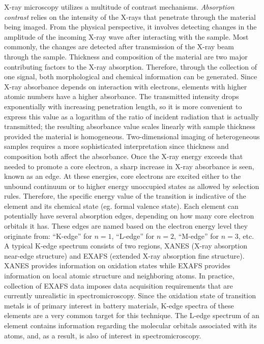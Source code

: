 \documentclass[journal=cmatex,manuscript=perspective]{achemso}
\begin{document}
X-ray microscopy utilizes a multitude of contrast
mechanisms. \emph{Absorption contrast} relies on the intensity of the X-rays
that penetrate through the material being imaged. From the physical
perspective, it involves detecting changes in the amplitude of the
incoming X-ray wave after interacting with the sample. Most commonly,
the changes are detected after transmission of the X-ray beam through
the sample. Thickness and composition of the material are two major
contributing factors to the X-ray absorption. Therefore, through the
collection of one signal, both morphological and chemical information
can be generated. Since X-ray absorbance depends on interaction with
electrons, elements with higher atomic numbers have a higher
absorbance. The transmitted intensity drops exponentially with
increasing penetration length, so it is more convenient to express
this value as a logarithm of the ratio of incident radiation that is
actually transmitted; the resulting absorbance value scales linearly
with sample thickness provided the material is
homogeneous. Two-dimensional imaging of heterogeneous samples requires
a more sophisticated interpretation since thickness and composition
both affect the absorbance. Once the X-ray energy exceeds that needed
to promote a core electron, a sharp increase in X-ray absorbance is
seen, known as an edge. At these energies, core electrons are excited
either to the unbound continuum or to higher energy unoccupied states
as allowed by selection rules. Therefore, the specific energy value of
the transition is indicative of the element and its chemical state
(eg. formal valence state). Each element can potentially have
several absorption edges, depending on how many core electron orbitals
it has. These edges are named based on the electron energy level they
originate from: ``K-edge'' for $n=1$, ``L-edge'' for $n=2$, ``M-edge''
for $n=3$, etc. A typical K-edge spectrum consists of two regions,
XANES (X-ray absorption near-edge structure) and EXAFS (extended X-ray
absorption fine structure). XANES provides information on oxidation
states while EXAFS provides information on local atomic structure and
neighboring atoms. In practice, collection of EXAFS data imposes data
acquisition requirements that are currently unrealistic in
spectromicroscopy. Since the oxidation state of transition metals is
of primary interest in battery materials, K-edge spectra of these
elements are a very common target for this technique. The L-edge
spectrum of an element contains information regarding the molecular
orbitals associated with its atoms, and, as a result, is also of
interest in spectromicroscopy.
\end{document}
